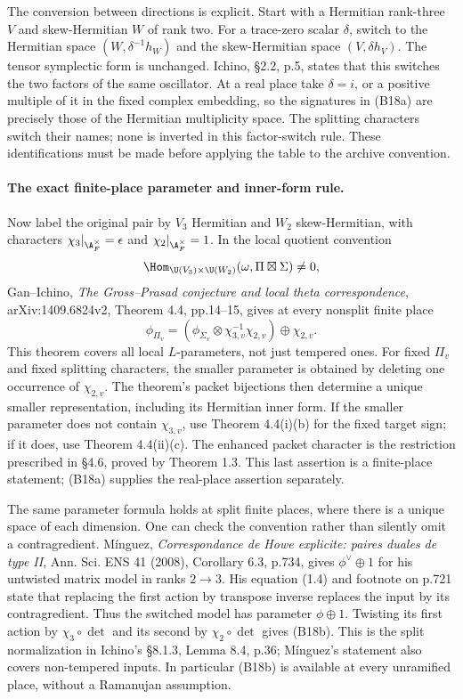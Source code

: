 The conversion between directions is explicit. Start with a
Hermitian rank-three $V$ and skew-Hermitian $W$ of rank two.
For a trace-zero scalar $\delta$, switch to the Hermitian space
$(W,\delta^{-1}h_W)$ and the skew-Hermitian space
$(V,\delta h_V)$. The tensor symplectic form is unchanged.
Ichino, \S2.2, p.5, states that this switches the two factors of
the same oscillator. At a real place take $\delta=i$, or a
positive multiple of it in the fixed complex embedding, so the
signatures in (B18a) are precisely those of the Hermitian
multiplicity space. The splitting characters switch their names;
none is inverted in this factor-switch rule. These identifications
must be made before applying the table to the archive convention.

\paragraph{The exact finite-place parameter and inner-form rule.}
Now label the original pair by $V_3$ Hermitian and $W_2$
skew-Hermitian, with characters $\chi_3|_{\A_F^\times}=\epsilon$
and $\chi_2|_{\A_F^\times}=1$. In the local quotient convention
\[
 \Hom_{\U(V_3)\times\U(W_2)}
       (\omega,\Pi\boxtimes\Sigma)\ne0,
\]
Gan--Ichino, \emph{The Gross--Prasad conjecture and local theta
correspondence}, arXiv:1409.6824v2, Theorem 4.4, pp.14--15,
gives at every nonsplit finite place
\[
 \phi_{\Pi_v}
    =(\phi_{\Sigma_v}\otimes\chi_{3,v}^{-1}\chi_{2,v})
                                      \oplus\chi_{2,v}.
 \tag{B18b}
\]
This theorem covers all local $L$-parameters, not just tempered
ones. For fixed $\Pi_v$ and fixed splitting characters, the
smaller parameter is obtained by deleting one occurrence of
$\chi_{2,v}$. The theorem's packet bijections then determine a
unique smaller representation, including its Hermitian inner
form. If the smaller parameter does not contain $\chi_{3,v}$,
use Theorem 4.4(i)(b) for the fixed target sign; if it does,
use Theorem 4.4(ii)(c). The enhanced packet character is the
restriction prescribed in \S4.6, proved by Theorem 1.3. This
last assertion is a finite-place statement; (B18a) supplies the
real-place assertion separately.

The same parameter formula holds at split finite places, where
there is a unique space of each dimension. One can check the
convention rather than silently omit a contragredient.
M\'inguez, \emph{Correspondance de Howe explicite: paires duales
de type II}, Ann. Sci. ENS 41 (2008), Corollary 6.3, p.734,
gives $\phi^\vee\oplus1$ for his untwisted matrix model in
ranks $2\to3$. His equation (1.4) and footnote on p.721 state
that replacing the first action by transpose inverse replaces
the input by its contragredient. Thus the switched model has
parameter $\phi\oplus1$. Twisting its first action by
$\chi_3\circ\det$ and its second by $\chi_2\circ\det$ gives
(B18b). This is the split normalization in Ichino's \S8.1.3,
Lemma 8.4, p.36; M\'inguez's statement also covers non-tempered
inputs. In particular (B18b) is available at every unramified
place, without a Ramanujan assumption.

